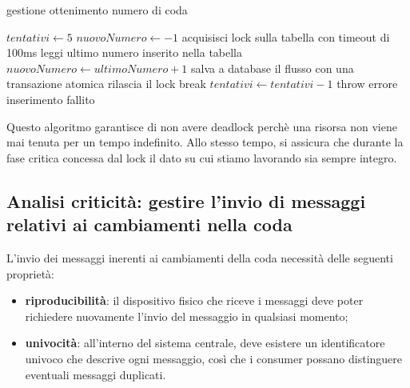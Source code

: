 \documentclass[a4paper, titlepage, 12pt, openright, twoside]{book}
\begin{document}
\begin{algorithm}
\caption{gestione ottenimento numero di coda}
\begin{algorithmic}[1]
\State $tentativi \gets 5$
\State $nuovoNumero \gets -1$
\State acquisisci lock sulla tabella con timeout di 100ms
\State leggi ultimo numero inserito nella tabella
\State $nuovoNumero \gets ultimoNumero + 1$
\State salva a database il flusso con una transazione atomica
\State rilascia il lock
\State break
\Else
\State $tentativi \gets tentativi - 1$
\EndIf
\EndWhile
{}
\State throw errore inserimento fallito
\EndIf
\end{algorithmic}
\end{algorithm}

Questo algoritmo garantisce di non avere deadlock perchè una risorsa non viene mai tenuta per un tempo indefinito. Allo stesso tempo, si assicura che durante la fase critica concessa dal lock il dato su cui stiamo lavorando sia sempre integro.

\subsection{Analisi criticità: gestire l'invio di messaggi relativi ai cambiamenti nella coda}

L'invio dei messaggi inerenti ai cambiamenti della coda necessità delle seguenti proprietà:

\begin{itemize}
	\item \textbf{riproducibilità}: il dispositivo fisico che riceve i messaggi deve poter richiedere nuovamente l'invio del messaggio in qualsiasi momento;
	\item \textbf{univocità}: all'interno del sistema centrale, deve esistere un identificatore univoco che descrive ogni messaggio, così che i consumer possano distinguere eventuali messaggi duplicati.
\end{itemize}
\end{document}
